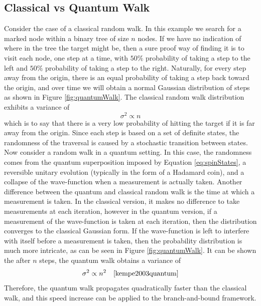 \subsection{Classical vs Quantum Walk}

Consider the case of a classical random walk. In this example we search for a marked node within a binary tree of size $n$ nodes. 
If we have no indication of where in the tree the target might be, then a sure proof way of finding it is to visit each node, one step at a time, with $50\%$ probability of taking a step to the left and $50\%$ probability of taking a step to the right. 
Naturally, for every step away from the origin, there is an equal probability of taking a step back toward the origin, and over time we will obtain a normal Gaussian distribution of steps as shown in Figure \ref{fig:quantumWalk}. 
The classical random walk distribution exhibits a variance of 
\begin{equation}
	\sigma^2 \propto n
\end{equation}
which is to say that there is a very low probability of hitting the target if it is far away from the origin.
Since  each step is based on a set of definite states, the randomness of the traversal is caused by a stochastic transition between states.
Now consider a random walk in a quantum setting. 
In this case, the randomness comes from the quantum superposition imposed by Equation \ref{eq:spinStates}, a reversible unitary evolution (typically in the form of a Hadamard coin), and a collapse of the wave-function when a measurement is actually taken. 
Another difference between the quantum and classical random walk is the time at which a measurement is taken. 
In the classical version, it makes no difference to take measurements at each iteration, however in the quantum version, if a measurement of the wave-function is taken at each iteration, then the distribution converges to the classical Gaussian form. 
If the wave-function is left to interfere with itself before a measurement is taken, then the probability distribution is much more intricate, as can be seen in Figure \ref{fig:quantumWalk}.
It can be shown the after $n$ steps, the quantum walk obtains a variance of 
\begin{equation}
	\sigma^2 \propto n^2 \quad\cite{kempe2003quantum}
\end{equation}
Therefore, the quantum walk propagates quadratically faster than the classical walk, and this speed increase can be applied to the branch-and-bound framework. 

